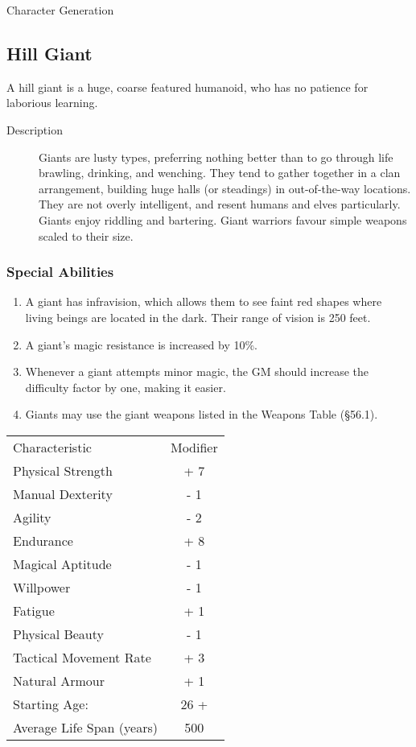 \begin{Chapter}{Character Generation}
\subsection{Hill Giant}

A hill giant is a huge, coarse featured humanoid, who has no patience
for laborious learning.

\begin{description}
\item[Description] Giants are lusty types, preferring nothing better
  than to go through life brawling, drinking, and wenching.  They tend
  to gather together in a clan arrangement, building huge halls (or
  steadings) in out-of-the-way locations.  They are not overly
  intelligent, and resent humans and elves particularly.  Giants enjoy
  riddling and bartering.  Giant warriors favour simple weapons scaled
  to their size.
\end{description}

\subsubsection{Special Abilities}

\begin{enumerate}
\item A giant has infravision, which allows them to see faint red
  shapes where living beings are located in the dark. Their range of
  vision is 250 feet.

\item A giant’s magic resistance is increased by 10\%. 

\item Whenever a giant attempts minor magic, the GM should increase
  the difficulty factor by one, making it easier.

\item Giants may use the giant weapons listed in the Weapons Table
  (§56.1).

\end{enumerate}

\begin{tabularx}{\columnwidth}{Xc}
Characteristic			& Modifier \\
Physical Strength		& + 7 \\
Manual Dexterity		& - 1 \\
Agility				& - 2 \\
Endurance			& + 8 \\
Magical Aptitude		& - 1 \\
Willpower			& - 1 \\
Fatigue				& + 1 \\
Physical Beauty			& - 1 \\
Tactical Movement Rate		& + 3 \\
Natural Armour			& + 1 \\
Starting Age:			& 26 + \\
Average Life Span (years)	& 500 \\
\end{tabularx}


\end{Chapter}
